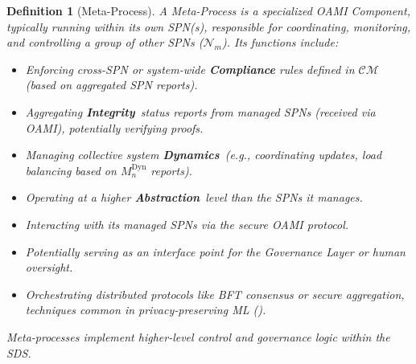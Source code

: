 \documentclass[12pt,a4paper]{report}
\renewcommand{\citep}[1]{\textit{\scriptsize{(\cite{#1})}}}
\newtheorem{definition}{Definition}[section]
\newcommand{\Integrity}{\textbf{Integrity}}
\newcommand{\Abstraction}{\textbf{Abstraction}}
\newcommand{\Dynamics}{\textbf{Dynamics}}
\begin{document}
	\begin{definition}[Meta-Process]
		\label{def:meta_process}
		A Meta-Process is a specialized OAMI Component, typically running within its own SPN(s), responsible for coordinating, monitoring, and controlling a group of other SPNs ($\mathcal{N}_m$). Its functions include:
		\begin{itemize}[noitemsep]
			\item Enforcing cross-SPN or system-wide \textbf{Compliance} rules defined in $\mathcal{CM}$ (based on aggregated SPN reports).
			\item Aggregating \Integrity\ status reports from managed SPNs (received via OAMI), potentially verifying proofs.
			\item Managing collective system \Dynamics\ (e.g., coordinating updates, load balancing based on $M_n^{\text{Dyn}}$ reports).
			\item Operating at a higher \Abstraction\ level than the SPNs it manages.
			\item Interacting with its managed SPNs via the secure OAMI protocol.
			\item Potentially serving as an interface point for the Governance Layer or human oversight.
			\item Orchestrating distributed protocols like BFT consensus or secure aggregation, techniques common in privacy-preserving ML \citep{AdditionalCitationRef54}.
		\end{itemize}
		Meta-processes implement higher-level control and governance logic within the SDS.
	\end{definition}
	
\end{document}
